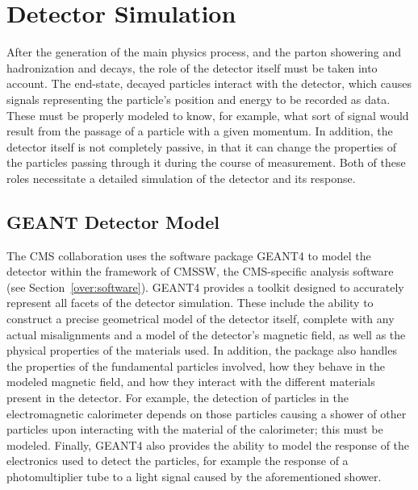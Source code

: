 \section{Detector Simulation}
\label{sim:Detector}

After the generation of the main physics process, 
and the parton showering and hadronization and decays, 
the role of the detector itself must be taken into account.  
The end-state, decayed particles interact with 
the detector, which causes signals representing 
the particle's position and energy to be recorded as data.  
These must be properly modeled to know, for example, 
what sort of signal would result from the passage of a particle 
with a given momentum.  
In addition, the detector itself is not completely passive, 
in that it can change the properties of the 
particles passing through it during the course of measurement.  
Both of these roles necessitate a detailed simulation 
of the detector and its response.  


\subsection{GEANT Detector Model}
\label{sim:DetectorGeant}



The CMS collaboration uses the software package 
GEANT4 \cite{GEANT4} to model the detector 
within the framework of CMSSW, 
the CMS-specific analysis software 
(see Section~\ref{over:software}).  
GEANT4 provides a toolkit designed 
to accurately represent all facets of 
the detector simulation.  
These include the ability to construct 
a precise geometrical model of the 
detector itself, 
complete with any actual misalignments 
and a model of the detector's magnetic field, 
as well as the physical properties 
of the materials used.  
In addition, the package also handles 
the properties of the 
fundamental particles involved, 
how they behave in the modeled 
magnetic field, 
and how they interact with the different 
materials present in the detector.  
For example, the detection of particles 
in the electromagnetic calorimeter 
depends on those particles causing 
a shower of other particles upon 
interacting with the material of the 
calorimeter; 
this must be modeled.  
Finally, GEANT4 also provides 
the ability to model the response of 
the electronics used to detect the particles, 
for example the response of a photomultiplier tube 
to a light signal caused by the aforementioned shower.  


